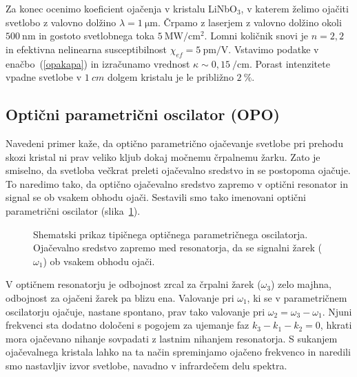Za konec ocenimo koeficient ojačenja v kristalu 
LiNbO$_{3}$, v katerem želimo
ojačiti svetlobo z valovno dolžino $\lambda = 1~\si{\micro\metre}$. Črpamo z laserjem z 
valovno dolžino okoli $500~\si{\nano\metre}$ in gostoto svetlobnega 
toka $5~\si{\mega\watt}/\si{\centi\metre}^{2}$. Lomni količnik snovi je 
$n = 2,2$ in efektivna nelinearna susceptibilnost  $\chi_{ef} = 5~\si{\pico\metre}/\si{\volt}$. 
Vstavimo podatke v enačbo~(\ref{opakapa}) in izračunamo vrednost 
$\kappa \sim 0,15~/\si{\centi\metre}$. Porast intenzitete vpadne svetlobe v $1~\si{cm}$ 
dolgem kristalu je le približno $2~\%$. 

\subsection*{Optični parametrični oscilator (OPO)}
Navedeni primer kaže, da optično parametrično ojačevanje svetlobe pri prehodu skozi kristal ni prav veliko
kljub dokaj močnemu črpalnemu žarku. Zato je smiselno, da svetloba večkrat preleti
ojačevalno sredstvo in se postopoma ojačuje. To naredimo tako, 
da optično ojačevalno sredstvo zapremo v optični 
resonator
in signal se ob vsakem obhodu ojači. Sestavili smo tako imenovani
optični parametrični oscilator (slika~\ref{fig:opo}). 
\begin{figure}[ht]
\centering
\def\svgwidth{90truemm} 

\caption{Shematski prikaz tipičnega optičnega parametričnega oscilatorja. Ojačevalno sredstvo
zapremo med resonatorja, da se signalni žarek ($\omega_1$) ob vsakem obhodu ojači.}
\label{fig:opo}
\end{figure}

V optičnem resonatorju je odbojnost zrcal za črpalni žarek ($\omega_3$) zelo majhna, 
odbojnost za ojačeni žarek pa blizu ena. Valovanje pri $\omega_1$,
ki se v parametričnem oscilatorju ojačuje, nastane spontano, prav tako valovanje pri 
$\omega_2 = \omega_3 -\omega_1$. Njuni frekvenci sta dodatno določeni s pogojem za 
ujemanje faz $ k_3 - k_1 - k_2 = 0$, 
hkrati mora ojačevano nihanje sovpadati z lastnim nihanjem resonatorja. 
S sukanjem ojačevalnega kristala lahko na ta način spreminjamo
ojačeno frekvenco in naredili smo nastavljiv izvor svetlobe, navadno v 
infrardečem delu spektra.
\newpage

